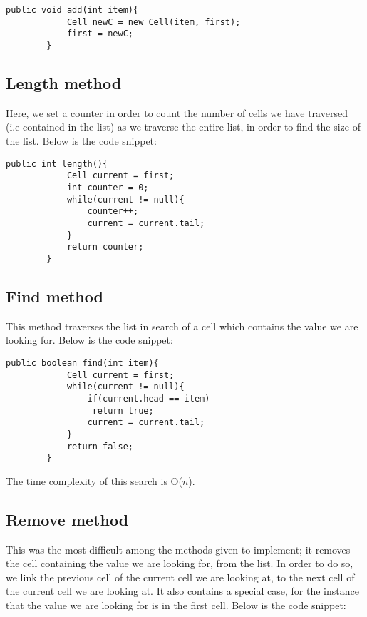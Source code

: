\documentclass[a4paper,11pt]{article}
\begin{document}
\begin{verbatim}
public void add(int item){
            Cell newC = new Cell(item, first); 
            first = newC;
        }
\end{verbatim}

\subsection*{Length method}

Here, we set a counter in order to count the number of cells we have traversed (i.e contained in the list) as we traverse the entire list, in order to find the size of the list. Below is the code snippet:
 
\begin{verbatim}
public int length(){
            Cell current = first;
            int counter = 0;
            while(current != null){
                counter++;
                current = current.tail;
            }
            return counter;
        }
\end{verbatim}


\subsection*{Find method}

This method traverses the list in search of a cell which contains the value we are looking for. Below is the code snippet:
 
\begin{verbatim}
public boolean find(int item){
            Cell current = first;
            while(current != null){
                if(current.head == item)
                 return true;
                current = current.tail;
            }
            return false;
        }
\end{verbatim}
The time complexity of this search is O($n$).

\subsection*{Remove method}

This was the most difficult among the methods given to implement; it removes the cell containing the value we are looking for, from the list. In order to do so, we link the previous cell of the current cell we are looking at, to the next cell of the current cell we are looking at. It also contains a special case, for the instance that the value we are looking for is in the first cell. Below is the code snippet:
\end{document}
